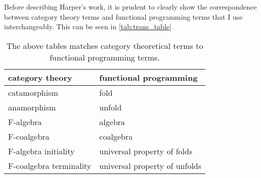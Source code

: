 Before describing Harper's work, it is prudent to clearly show the correspondence between category theory terms and functional programming terms that I use interchangeably.
This can be seen in \autoref{tab:trans_table}
\begin{table}[h]
  \centering
  \begin{tabular}{|l|l|}\hline
    \textbf{category theory} & \textbf{functional programming} \\\hline
    catamorphism             & fold                            \\
    anamorphism              & unfold                          \\
    F-algebra                & algebra                         \\
    F-coalgebra              & coalgebra                       \\
    F-algebra initiality     & universal property of folds     \\
    F-coalgebra terminality  & universal property of unfolds   \\\hline
  \end{tabular}
  \caption{The above tables matches category theoretical terms to functional programming terms.}
  \label{tab:trans_table}
\end{table}
